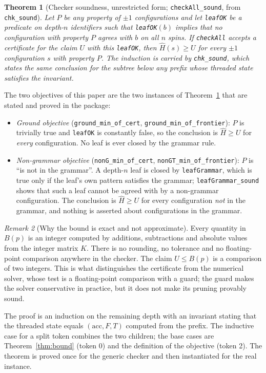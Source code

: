 \documentclass[11pt,a4paper]{article}
\theoremstyle{plain}
\newtheorem{theorem}{Theorem}[section]
\theoremstyle{definition}
\theoremstyle{remark}
\newtheorem{remark}[theorem]{Remark}
\newcommand{\lean}[1]{\nolinkurl{#1}}
\begin{document}
\begin{theorem}[Checker soundness, unrestricted form; \lean{checkAll_sound}, from \lean{chk_sound}]\label{thm:chk}
Let $P$ be any property of $\pm1$ configurations and let \lean{leafOK} be a predicate on depth-$n$ identifiers such that \lean{leafOK}$(b)$ implies that no configuration with property $P$ agrees with $b$ on all $n$ spins. If \lean{checkAll} accepts a certificate for the claim $U$ with this \lean{leafOK}, then $\hat H(s)\ge U$ for every $\pm1$ configuration $s$ with property $P$. The induction is carried by \lean{chk_sound}, which states the same conclusion for the subtree below any prefix whose threaded state satisfies the invariant.
\end{theorem}
The two objectives of this paper are the two instances of Theorem~\ref{thm:chk} that are stated and proved in the package:
\begin{itemize}[leftmargin=1.6em]
\item \emph{Ground objective} (\lean{ground_min_of_cert}, \lean{ground_min_of_frontier}): $P$ is trivially true and \lean{leafOK} is constantly false, so the conclusion is $\hat H\ge U$ for \emph{every} configuration. No leaf is ever closed by the grammar rule.
\item \emph{Non-grammar objective} (\lean{nonG_min_of_cert}, \lean{nonGT_min_of_frontier}): $P$ is ``is not in the grammar''. A depth-$n$ leaf is closed by \lean{leafGrammar}, which is true only if the leaf's own pattern satisfies the grammar; \lean{leafGrammar_sound} shows that such a leaf cannot be agreed with by a non-grammar configuration. The conclusion is $\hat H\ge U$ for every configuration \emph{not} in the grammar, and nothing is asserted about configurations in the grammar.
\end{itemize}
\begin{remark}[Why the bound is exact and not approximate]
Every quantity in $B(p)$ is an integer computed by additions, subtractions and absolute values from the integer matrix $\hat K$. There is no rounding, no tolerance and no floating-point comparison anywhere in the checker. The claim $U\le B(p)$ is a comparison of two integers. This is what distinguishes the certificate from the numerical solver, whose test is a floating-point comparison with a guard; the guard makes the solver conservative in practice, but it does not make its pruning provably sound.
\end{remark}

The proof is an induction on the remaining depth with an invariant stating that the threaded state equals $(\mathrm{acc},F,T)$ computed from the prefix. The inductive case for a split token combines the two children; the base cases are Theorem~\ref{thm:bound} (token 0) and the definition of the objective (token 2). The theorem is proved once for the generic checker and then instantiated for the real instance.
\end{document}
